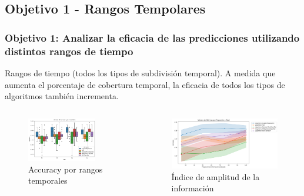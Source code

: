 \documentclass{beamer}
\begin{document}
\subsection{ Objetivo 1 - Rangos Tempolares}
\begin{frame}
	\frametitle{Objetivo 1: Analizar la eficacia de las predicciones utilizando distintos rangos de tiempo}
		\begin{block}{Rangos de tiempo (todos los tipos de subdivisión temporal).} 
			 A medida que aumenta el porcentaje de cobertura temporal, la eficacia de todos los tipos de algoritmos también incrementa.
	\end{block}
	\begin{columns}[c]
		\begin{column}{.5\textwidth}
			\begin{figure}
				\centering
				\includegraphics[width=0.8\textwidth]{figs/cap7/figura_19}
				\caption{Accuracy por rangos temporales}
			\end{figure}      
		\end{column}
		\begin{column}{.5\textwidth}
			\begin{figure}
				\centering
				\includegraphics[width=1\textwidth]{figs/cap7/figura_14}
				\caption{Índice de amplitud de la información}
			\end{figure}
		\end{column}
	\end{columns}

\end{frame}
\end{document}
